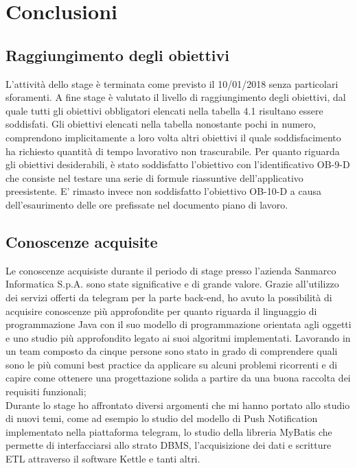 
\chapter{Conclusioni}
\label{cap:conclusioni}


\section{Raggiungimento degli obiettivi}
L'attività dello stage è terminata come previsto il 10/01/2018 senza particolari sforamenti. 
A fine stage è valutato il livello di raggiungimento degli obiettivi, dal quale tutti gli obiettivi obbligatori elencati nella tabella
4.1 risultano essere soddisfati. Gli obiettivi elencati nella tabella nonostante pochi in numero, comprendono implicitamente a loro volta altri obiettivi il quale soddisfacimento ha richiesto quantità di tempo lavorativo non trascurabile. Per quanto riguarda gli obiettivi desiderabili, è stato soddisfatto l'obiettivo con l'identificativo OB-9-D che consiste nel testare una serie di formule riassuntive dell'applicativo preesistente. E' rimasto invece non soddisfatto l'obiettivo OB-10-D a causa dell'esaurimento delle ore prefissate nel documento piano di lavoro.

\section{Conoscenze acquisite}
Le conoscenze acquisiste durante il periodo di stage presso l'azienda Sanmarco Informatica S.p.A. sono state significative e di grande valore. Grazie all'utilizzo dei servizi offerti da telegram per la parte back-end, ho avuto la possibilità di acquisire conoscenze più approfondite per quanto riguarda il linguaggio di programmazione Java con il suo modello di programmazione orientata agli oggetti e uno studio più approfondito legato ai suoi algoritmi implementati. Lavorando in un team composto da cinque persone sono stato in grado di comprendere quali sono le più comuni best practice da applicare su alcuni problemi ricorrenti e di capire  come ottenere una progettazione solida a partire da una buona raccolta dei requisiti funzionali; \\ Durante lo stage ho affrontato diversi argomenti che mi hanno portato allo studio di nuovi temi, come ad esempio lo studio del modello di Push Notification implementato nella piattaforma telegram, lo studio della libreria MyBatis che permette di interfacciarsi allo strato DBMS, l'acquisizione dei dati e scritture ETL attraverso il software Kettle e tanti altri. 

